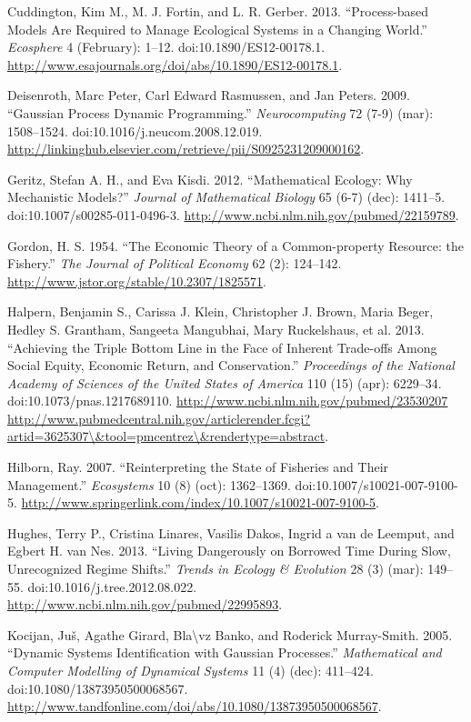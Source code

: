 \documentclass[author-year, review]{elsarticle} %
\begin{document}
Cuddington, Kim M., M. J. Fortin, and L. R. Gerber. 2013.
``Process-based Models Are Required to Manage Ecological Systems in a
Changing World.'' \emph{Ecosphere} 4 (February): 1--12.
doi:10.1890/ES12-00178.1.
\url{http://www.esajournals.org/doi/abs/10.1890/ES12-00178.1}.

Deisenroth, Marc Peter, Carl Edward Rasmussen, and Jan Peters. 2009.
``Gaussian Process Dynamic Programming.'' \emph{Neurocomputing} 72 (7-9)
(mar): 1508--1524. doi:10.1016/j.neucom.2008.12.019.
\url{http://linkinghub.elsevier.com/retrieve/pii/S0925231209000162}.

Geritz, Stefan A. H., and Eva Kisdi. 2012. ``Mathematical Ecology: Why
Mechanistic Models?'' \emph{Journal of Mathematical Biology} 65 (6-7)
(dec): 1411--5. doi:10.1007/s00285-011-0496-3.
\url{http://www.ncbi.nlm.nih.gov/pubmed/22159789}.

Gordon, H. S. 1954. ``The Economic Theory of a Common-property Resource:
the Fishery.'' \emph{The Journal of Political Economy} 62 (2): 124--142.
\url{http://www.jstor.org/stable/10.2307/1825571}.

Halpern, Benjamin S., Carissa J. Klein, Christopher J. Brown, Maria
Beger, Hedley S. Grantham, Sangeeta Mangubhai, Mary Ruckelshaus, et al.
2013. ``Achieving the Triple Bottom Line in the Face of Inherent
Trade-offs Among Social Equity, Economic Return, and Conservation.''
\emph{Proceedings of the National Academy of Sciences of the United
States of America} 110 (15) (apr): 6229--34.
doi:10.1073/pnas.1217689110.
\href{http://www.ncbi.nlm.nih.gov/pubmed/23530207 http://www.pubmedcentral.nih.gov/articlerender.fcgi?artid=3625307/\&tool=pmcentrez/\&rendertype=abstract}{http://www.ncbi.nlm.nih.gov/pubmed/23530207
http://www.pubmedcentral.nih.gov/articlerender.fcgi?artid=3625307\textbackslash{}\&tool=pmcentrez\textbackslash{}\&rendertype=abstract}.

Hilborn, Ray. 2007. ``Reinterpreting the State of Fisheries and Their
Management.'' \emph{Ecosystems} 10 (8) (oct): 1362--1369.
doi:10.1007/s10021-007-9100-5.
\url{http://www.springerlink.com/index/10.1007/s10021-007-9100-5}.

Hughes, Terry P., Cristina Linares, Vasilis Dakos, Ingrid a van de
Leemput, and Egbert H. van Nes. 2013. ``Living Dangerously on Borrowed
Time During Slow, Unrecognized Regime Shifts.'' \emph{Trends in Ecology
\& Evolution} 28 (3) (mar): 149--55. doi:10.1016/j.tree.2012.08.022.
\url{http://www.ncbi.nlm.nih.gov/pubmed/22995893}.

Kocijan, Juš, Agathe Girard, Bla\textbackslash{}vz Banko, and Roderick
Murray-Smith. 2005. ``Dynamic Systems Identification with Gaussian
Processes.'' \emph{Mathematical and Computer Modelling of Dynamical
Systems} 11 (4) (dec): 411--424. doi:10.1080/13873950500068567.
\url{http://www.tandfonline.com/doi/abs/10.1080/13873950500068567}.
\end{document}
